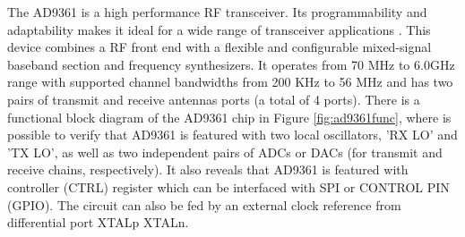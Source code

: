 The AD9361 is a high performance RF transceiver. Its programmability and
adaptability makes it ideal for a wide range of transceiver applications
\cite{web:ad9361wiki}. This device combines a RF front end with a flexible and
configurable mixed-signal baseband section and frequency synthesizers. It
operates from 70 MHz to 6.0GHz range with supported channel bandwidths from 200
KHz to 56 MHz and has two pairs of transmit and receive antennas ports (a total
of 4 ports). There is a functional block diagram of the AD9361 chip in Figure
\ref{fig:ad9361func}, where is possible to verify that AD9361 is featured with
two local oscillators, 'RX LO' and 'TX LO', as well as two independent pairs of
ADCs or DACs (for transmit and receive chains, respectively). It also reveals
that AD9361 is featured with controller (CTRL) register which can be interfaced
with SPI or CONTROL PIN (GPIO). The circuit can also be fed by an external clock
reference from differential port XTALp XTALn.

